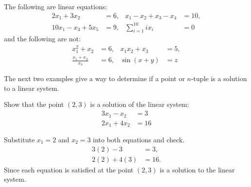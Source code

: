 \begin{example}
The following are linear equations:
%
\begin{align*}
2x_1 + 3x_2 & = 6, & x_1 -x_2+x_3-x_4 & = 10, \\
 10x_1 - x_3 + 5x_5 & = 9,  & \sum_{i=1}^{10} i x_i & = 0
\end{align*}
and the following are not:
%
\begin{align*}
x_1^2+x_2 & = 6, & x_1x_2 + x_3 & = 5, \\
\frac{x_1+x_2}{x_3} & = 6, & \sin(x+y) &= z
\end{align*}
\end{example}

The next two examples give a way to determine if a point or $n$-tuple is a solution to a linear system.

\vspace{1in}

\begin{example}
Show that the point $(2,3)$ is a solution of  the linear system:
%
\begin{align*}
3x_1 - x_2 & = 3 \\
2x_1 + 4x_2 & = 16
\end{align*}

\solution

Substitute $x_1=2$ and $x_2=3$ into both equations and check.
\begin{align*}
3(2) - 3 & = 3, \\
2(2) + 4(3) & = 16.
\end{align*}
Since each equation is satisfied at the point $(2,3)$ is a solution to the linear system.

\end{example}

\phantom{Here's some text}



\phantom{Here's some text}

